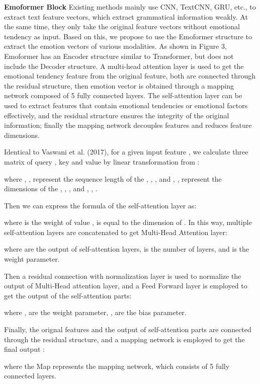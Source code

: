 \documentclass[11pt]{article}
\begin{document}
\noindent\textbf{Emoformer Block} Existing methods mainly use CNN, TextCNN, GRU, etc., to extract text feature vectors, which extract grammatical information weakly. At the same time, they only take the original feature vectors without emotional tendency as input. Based on this, we propose to use the Emoformer structure to extract the emotion vectors of various modalities. As shown in Figure 3, Emoformer has an Encoder structure similar to Transformer, but does not include the Decoder structure. A multi-head attention layer is used to get the emotional tendency feature from the original feature, both are connected through the residual structure, then emotion vector is obtained through a mapping network composed of 5 fully connected layers. The self-attention layer can be used to extract features that contain emotional tendencies or emotional factors effectively, and the residual structure ensures the integrity of the original information; finally the mapping network decouples features and reduces feature dimensions.

Identical to Vaswani et al. (2017), for a given input feature , we calculate three matrix of query   , key    and value    by linear transformation from :

where , ,  represent the sequence length of the , , , and , ,  represent the dimensions of the , , , and   ,   ,   .

Then we can express the formula of the self-attention layer as:

where  is the weight of value ,  is equal to the dimension of . In this way, multiple self-attention layers are concatenated to get Multi-Head Attention layer:

where  are the output of self-attention layers,  is the number of layers, and  is the weight parameter.

Then a residual connection with normalization layer is used to normalize the output of Multi-Head attention layer, and a Feed Forward layer is employed to get the output of the self-attention parts:



where ,  are the weight parameter, ,  are the bias parameter.

Finally, the orignal features  and the output of self-attention parts  are connected through the residual structure, and a mapping network is employed to get the final output :


where the Map represents the mapping network, which consists of 5 fully connected layers.
\end{document}
